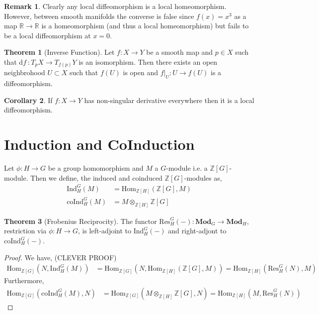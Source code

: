 \documentclass[12pt]{extarticle}
\newcommand{\Hom}[3]{\mathrm{Hom}_{#1}\left( #2, #3 \right)}
\newcommand{\Z}{\mathbb{Z}}
\newcommand{\R}{\mathbb{R}}
\renewcommand{\d}[1]{ \mathrm{d}#1 \:}
\theoremstyle{definition}
\newtheorem{theorem}{Theorem}[section]
\newtheorem{corollary}[theorem]{Corollary}
\newtheorem{remark}{Remark}
\newenvironment{definition}[1][Definition:]{\begin{trivlist}
\item[\hskip \labelsep {\bfseries #1}]}{\end{trivlist}}
\begin{document}
\begin{remark}
Clearly any local diffeomorphism is a local homeomorphism. However, between smooth manifolds the converse is false since $f(x) = x^3$ as a map $\R \to \R$ is a homeomorphism (and thus a local homeomorphism) but fails to be a local diffeomorphism at $x = 0$. 
\end{remark}

\begin{theorem}[Inverse Function]
Let $f : X \to Y$ be a smooth map and $p \in X$ such that $\d{f} : T_p X \to T_{f(p)} Y$ is an isomorphism. Then there exists an open neighbrohood $U \subset X$ such that $f(U)$ is open and $f|_U : U \to f(U)$ is a diffeomorphism. 
\end{theorem}

\begin{corollary}
If $f : X \to Y$ has non-singular derivative everywhere then it is a local diffeomorphism.
\end{corollary}


\section{Induction and CoInduction}


\newcommand{\Gal}[1]{\mathrm{Gal}\left( #1 \right)}
\newcommand{\Nm}{\mathrm{Nm}}
\newcommand{\Ind}[3]{\mathrm{Ind}^{#1}_{#2} \left(#3\right)}
\newcommand{\coInd}[3]{\mathrm{coInd}^{#1}_{#2} \left(#3\right)}
\newcommand{\Res}[3]{\mathrm{Res}^{#1}_{#2} \left( #3 \right)}
\newcommand{\Mod}{\mathbf{Mod}}


\begin{definition}
Let $\phi : H \to G$ be a group homomorphism and $M$ a $G$-module i.e. a $\Z[G]$-module. Then we define, the induced and coinduced $\Z[G]$-modules as,
\begin{align*}
\Ind{G}{H}{M} & = \Hom{\Z[H]}{\Z[G]}{M}
\\
\coInd{G}{H}{M} & = M \otimes_{\Z[H]} \Z[G] 
\end{align*}
\end{definition}

\begin{theorem}[Frobenius Reciprocity]
The functor $\Res{G}{H}{-} : \Mod_{G} \to \Mod_{H}$, restriction via $\phi : H \to G$, is left-adjoint to $\Ind{G}{H}{-}$ and right-adjont to $\coInd{G}{H}{-}$. 
\end{theorem}

\begin{proof}
We have, (CLEVER PROOF)
\begin{align*}
\Hom{\Z[G]}{N}{\Ind{G}{H}{M}} & = \Hom{\Z[G]}{N}{\Hom{\Z[H]}{\Z[G]}{M}} = \Hom{\Z[H]}{\Res{G}{H}{N}}{M}
\end{align*}
Furthermore,
\begin{align*}
\Hom{\Z[G]}{\coInd{G}{H}{M}}{N} & = \Hom{\Z[G]}{M \otimes_{\Z[H]} \Z[G]}{N} = \Hom{\Z[H]}{M}{\Res{G}{H}{N}}
\end{align*}
\end{proof}
\end{document}
